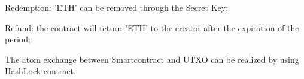 \documentclass[a4paper,11pt]{article}
\begin{document}
Redemption: 'ETH' can be removed through the Secret Key;

Refund: the contract will return 'ETH' to the creator after the expiration of the period;


The atom exchange between Smartcontract and UTXO can be realized by using HashLock contract.




\clearpage



%
%


\end{document}

